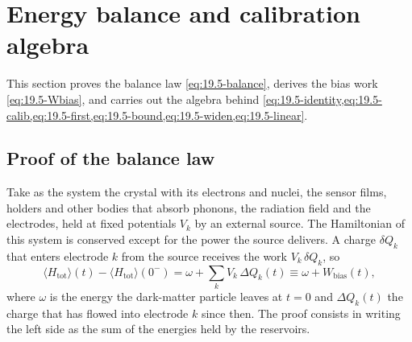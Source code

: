 \section{Energy balance and calibration algebra}\label{app:D.45}

This section proves the balance law \cref{eq:19.5-balance}, derives the bias work \cref{eq:19.5-Wbias}, and carries out the algebra behind \cref{eq:19.5-identity,eq:19.5-calib,eq:19.5-first,eq:19.5-bound,eq:19.5-widen,eq:19.5-linear}.

\subsection{Proof of the balance law}

Take as the system the crystal with its electrons and nuclei, the sensor films, holders and other bodies that absorb phonons, the radiation field and the electrodes, held at fixed potentials $V_k$ by an external source. The Hamiltonian of this system is conserved except for the power the source delivers. A charge $\delta Q_k$ that enters electrode $k$ from the source receives the work $V_k\,\delta Q_k$, so
\begin{equation*}
  \langle H_{\mathrm{tot}}\rangle(t) - \langle H_{\mathrm{tot}}\rangle(0^-) = \omega + \sum_kV_k\,\Delta Q_k(t) \equiv \omega + W_{\mathrm{bias}}(t) ,
\end{equation*}
where $\omega$ is the energy the dark-matter particle leaves at $t = 0$ and $\Delta Q_k(t)$ the charge that has flowed into electrode $k$ since then. The proof consists in writing the left side as the sum of the energies held by the reservoirs.

